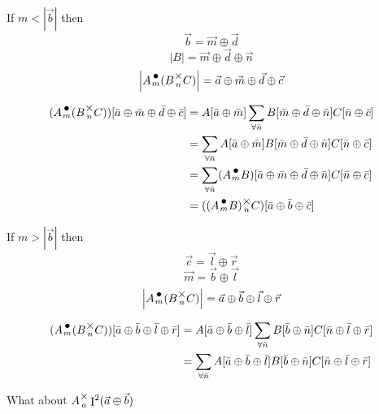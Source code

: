 \documentclass[12pt]{book}
\theoremstyle{plain}
\theoremstyle{definition}
\theoremstyle{ppart}
\theoremstyle{case}
\theoremstyle{solution}
\DeclareMathOperator{\Ident}{I}
\newcommand{\mmult}[1]{\text{\raisebox{1ex}{$\underset{#1}{\times}$}}}
\newcommand{\dmult}[1]{\text{\raisebox{1ex}{$\underset{#1}{\,\bullet\,}$}}}
\newcommand{\shape}[1]{\left|#1\right|}
\begin{document}
\begin{appendices}
If $m < \shape{\vec{b}}$ then
\[ \vec{b} = \vec{m} \oplus \vec{d} \]
\[ \shape{B} = \vec{m} \oplus \vec{d} \oplus \vec{n} \]
\[ \shape{A \dmult{m} (B \mmult{n} C)} = \vec{a} \oplus \vec{m} \oplus \vec{d} \oplus \vec{c} \]

\begin{align*}
(A \dmult{m} (B \mmult{n} C))[\bar{a} \oplus \bar{m} \oplus \bar{d} \oplus \bar{c}]
  &=
  A[\bar{a} \oplus \bar{m}] \sum_{\forall \bar{n}} B[\bar{m} \oplus \bar{d} \oplus \bar{n}] C[\bar{n} \oplus \bar{c}] \\
  &=
  \sum_{\forall \bar{n}} A[\bar{a} \oplus \bar{m}] B[\bar{m} \oplus \bar{d} \oplus \bar{n}] C[\bar{n} \oplus \bar{c}] \\
  &=
  \sum_{\forall \bar{n}} (A \dmult{m} B)[\bar{a} \oplus \bar{m} \oplus \bar{d} \oplus \bar{n}] C[\bar{n} \oplus \bar{c}] \\
  &= ((A \dmult{m} B) \mmult{n} C)[\bar{a} \oplus \bar{b} \oplus \bar{c}]
\end{align*}

If $m > \shape{\vec{b}}$ then
\[ \vec{c} = \vec{l} \oplus \vec{r} \]
\[ \vec{m} = \vec{b} \oplus \vec{l} \]
\[ \shape{A \dmult{m} (B \mmult{n} C)} = \vec{a} \oplus \vec{b} \oplus \vec{l} \oplus \vec{r} \]

\begin{align*}
(A \dmult{m} (B \mmult{n} C))[\bar{a} \oplus \bar{b} \oplus \bar{l} \oplus \bar{r}]
  &=
  A[\bar{a} \oplus \bar{b} \oplus \bar{l}] \sum_{\forall \bar{n}} B[\bar{b} \oplus \bar{n}] C[\bar{n} \oplus \bar{l} \oplus \bar{r}] \\
  &=
  \sum_{\forall \bar{n}} A[\bar{a} \oplus \bar{b} \oplus \bar{l}] B[\bar{b} \oplus \bar{n}] C[\bar{n} \oplus \bar{l} \oplus \bar{r}] \\
\end{align*}

What about $A \mmult{a} \Ident^2(\vec{a} \oplus \vec{b})$


\end{appendices}
\end{document}
